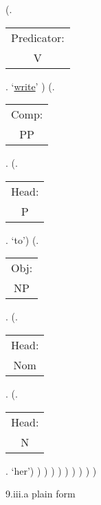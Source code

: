 \documentclass[12pt,letterpaper]{article}
\begin{document}
\begin{figure}
\begin{center}
\begin{parsetree}
			(.\begin{tabular}{c}Predicator:\\V\end{tabular}. `\underline{write}' )
			(.\begin{tabular}{c}Comp:\\PP\end{tabular}.
			(.\begin{tabular}{c}Head:\\P\end{tabular}. `to')
			(.\begin{tabular}{c}Obj:\\NP\end{tabular}. 
			(.\begin{tabular}{c}Head:\\Nom\end{tabular}. 
			(.\begin{tabular}{c}Head:\\N\end{tabular}. `her')
			)
			)
			)
			)
			)
			)
			)
			)
			)
			
		\end{parsetree}
		\hfill \break \hfill \break
		9.iii.a plain form
	\end{center}
\end{figure}
\end{document}
